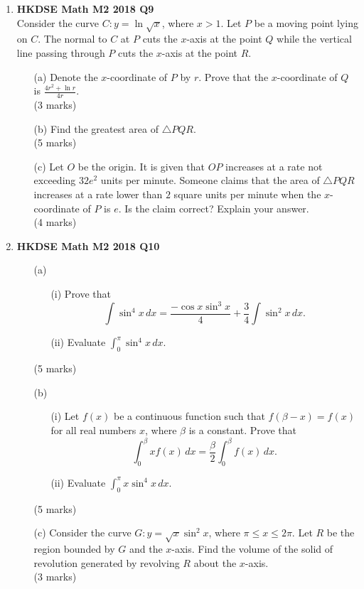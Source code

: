 \documentclass{report}
\begin{document}
\begin{enumerate}
	\item \textbf{HKDSE Math M2 2018 Q9}\\
	Consider the curve $C : y = \displaystyle\ln \sqrt{x}$, where $x > 1$. Let $P$ be a moving point lying on $C$. The normal to $C$ at $P$ cuts the $x$-axis at the point $Q$ while the vertical line passing through $P$ cuts the $x$-axis at the point $R$.  
	\begin{enumerate}
		\item [(a)]Denote the $x$-coordinate of $P$ by $r$. Prove that the $x$-coordinate of $Q$ is $\displaystyle\frac{4r^2+\ln r}{4r}$.  \\(3 marks)
		\item [(b)]Find the greatest area of $\triangle PQR$. \\(5 marks) 
		\item [(c)]Let $O$ be the origin. It is given that $OP$ increases at a rate not exceeding $32e^2$ units per minute. Someone claims that the area of $\triangle PQR$ increases at a rate lower than $2$ square units per minute when the $x$-coordinate of $P$ is $e$. Is the claim correct? Explain your answer. \\(4 marks) 
	\end{enumerate}

	\item \textbf{HKDSE Math M2 2018 Q10}
	\begin{enumerate}
		\item [(a)] 
		\begin{enumerate}
			\item [(i)]Prove that $$\displaystyle \int \sin^4{x}\,dx = \frac{-\cos{x}\sin^3{x}}{4} + \frac{3}{4} \int \sin^2{x} \,dx.$$ 
			\item [(ii)] Evaluate $\displaystyle \int_{0}^{\pi} \sin^4{x}\,dx$.
		\end{enumerate}
		(5 marks)
		\item [(b)] 
		\begin{enumerate}
			\item [(i)]Let $f(x)$ be a continuous function such that $f(\beta - x)= f(x)$ for all real numbers $x$, where $\beta$ is a constant. Prove that $$\displaystyle\int_{0}^{\beta} x f(x) \,dx = \frac{\beta}{2} \int_{0}^{\beta } f(x) \,dx.$$
			\item [(ii)] Evaluate $\displaystyle \int_{0}^{\pi} x\sin^4{x}\,dx$.
		\end{enumerate}
		(5 marks)
	\item [(c)]Consider the curve $G : y = \displaystyle \sqrt{x}\sin^2{x}$, where $\pi \leq x \leq 2\pi $.
	Let $R$ be the region bounded by $G$ and the $x$-axis.
	Find the volume of the solid of revolution generated by revolving $R$ about the $x$-axis. \\(3 marks) 
	\end{enumerate}


\end{enumerate}
\end{document}
